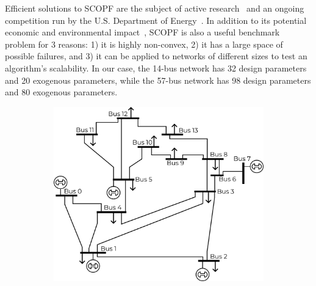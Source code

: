 Efficient solutions to SCOPF are the subject of active research~\cite{capitanescuStateoftheartChallengesFuture2011} and an ongoing competition run by the U.S. Department of Energy~\cite{u.s.departmentofenergyGridOptimizationCompetition}. In addition to its potential economic and environmental impact~\cite{cainHistoryOptimalPower2012}, SCOPF is also a useful benchmark problem for 3 reasons: 1) it is highly non-convex, 2) it has a large space of possible failures, and 3) it can be applied to networks of different sizes to test an algorithm's scalability. In our case, the 14-bus network has 32 design parameters and 20 exogenous parameters, while the 57-bus network has 98 design parameters and 80 exogenous parameters.

\begin{figure}[tb]
    \centering
    \begin{subfigure}[t]{0.4\linewidth}
        \centering
        \includegraphics[width=\linewidth]{images/global_methods/base_14_bus.png}
    \end{subfigure}
    \begin{subfigure}[t]{0.4\linewidth}
        \centering

\end{subfigure}
\end{figure}
